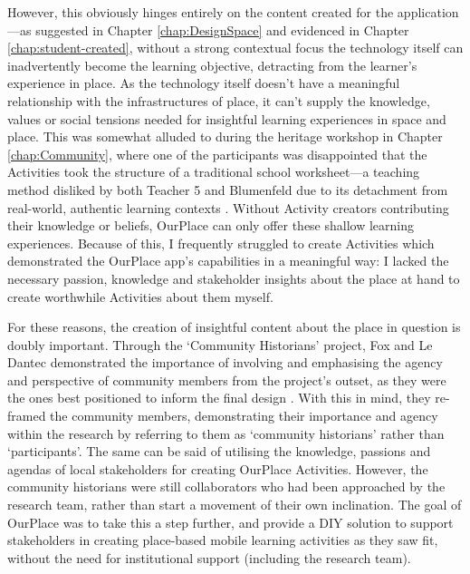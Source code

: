 However, this obviously hinges entirely on the content created for the application---as suggested in Chapter \ref{chap:DesignSpace} and evidenced in Chapter \ref{chap:student-created}, without a strong contextual focus the technology itself can inadvertently become the learning objective, detracting from the learner's experience in place. As the technology itself doesn't have a meaningful relationship with the infrastructures of place, it can't supply the knowledge, values or social tensions needed for insightful learning experiences in space and place. This was somewhat alluded to during the heritage workshop in Chapter \ref{chap:Community}, where one of the participants was disappointed that the Activities took the structure of a traditional school worksheet---a teaching method disliked by both Teacher 5 and Blumenfeld due to its detachment from real-world, authentic learning contexts \citep{Blumenfeld1991}. Without Activity creators contributing their knowledge or beliefs, OurPlace can only offer these shallow learning experiences. Because of this, I frequently struggled to create Activities which demonstrated the OurPlace app's capabilities in a meaningful way: I lacked the necessary passion, knowledge and stakeholder insights about the place at hand to create worthwhile Activities about them myself.

For these reasons, the creation of insightful content about the place in question is doubly important. Through the `Community Historians' project, Fox and Le Dantec demonstrated the importance of involving and emphasising the agency and perspective of community members from the project's outset, as they were the ones best positioned to inform the final design \citep{Fox2014}. With this in mind, they re-framed the community members, demonstrating their importance and agency within the research by referring to them as `community historians' rather than `participants'. The same can be said of utilising the knowledge, passions and agendas of local stakeholders for creating OurPlace Activities. However, the community historians were still collaborators who had been approached by the research team, rather than start a movement of their own inclination. The goal of OurPlace was to take this a step further, and provide a DIY solution to support stakeholders in creating place-based mobile learning activities as they saw fit, without the need for institutional support (including the research team).

